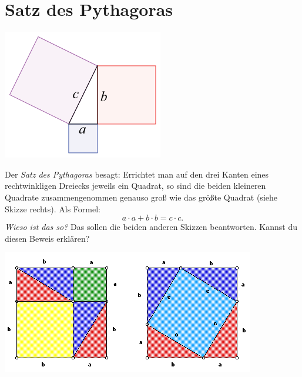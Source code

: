 \documentclass{../zirkelblatt}
\begin{document}
\section*{Satz des Pythagoras}
\begin{floatingfigure}[r]{4cm}
  \vspace{-1cm}
  \includegraphics[scale=0.5]{pythagoras-1}
\end{floatingfigure}
Der \emph{Satz des Pythagoras} besagt: Errichtet man auf den drei Kanten eines
rechtwinkligen Dreiecks jeweils ein Quadrat, so sind die beiden kleineren
Quadrate zusammengenommen genauso groß wie das größte Quadrat (siehe Skizze
rechts). Als Formel:
\[ a \cdot a + b \cdot b = c \cdot c. \]
\emph{Wieso ist das so?} Das sollen die beiden anderen Skizzen beantworten.
Kannst du diesen Beweis erklären?
\begin{center}
\includegraphics{pythagoras-2}
\end{center}

\vfill
\end{document}
